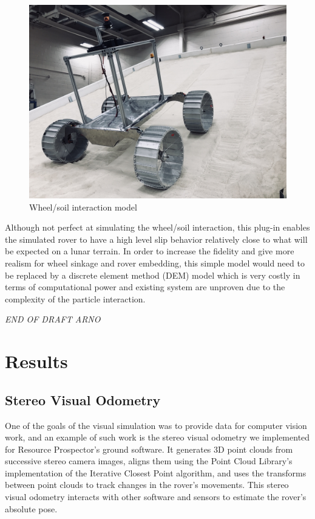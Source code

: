 \documentclass[twocolumn,letterpaper]{IEEEAerospaceCLS}  %
\begin{document}
\begin{figure}[h!]
	\includegraphics[width=\columnwidth]{figures/wheel_slip_MGRU.JPG}
   	\caption{Wheel/soil interaction model}
    \label{fig:wheelsoilmodel}
\end{figure}

Although not perfect at simulating the wheel/soil interaction, this plug-in enables the simulated rover to have a high level slip behavior relatively close to what will be expected on a lunar terrain. In order to increase the fidelity and give more realism for wheel sinkage and rover embedding, this simple model would need to be replaced by a discrete element method (DEM) model which is very costly in terms of computational power and existing system are unproven due to the complexity of the particle interaction.

\textit{END OF DRAFT ARNO}


\section{Results}

\subsection{Stereo Visual Odometry}
One of the goals of the visual simulation was to provide data for computer vision work, and an example of such work is the stereo visual odometry we implemented for Resource Prospector's ground software. It generates 3D point clouds from successive stereo camera images, aligns them using the Point Cloud Library's implementation of the Iterative Closest Point algorithm, and uses the transforms between point clouds to track changes in the rover's movements. This stereo visual odometry interacts with other software and sensors to estimate the rover's absolute pose.
\end{document}
